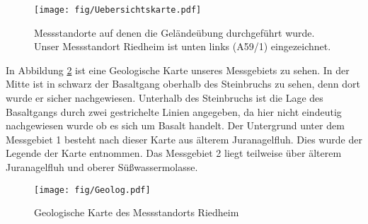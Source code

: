 \begin{figure}[h]
 \centering
 \texttt{[image: fig/Uebersichtskarte.pdf]}
 \caption[Messgebiete]{Messstandorte auf denen die Geländeübung durchgeführt wurde. Unser Messstandort Riedheim ist unten links (A59/1) eingezeichnet.}
 \label{abb:Messgebiete}
\end{figure}


In Abbildung \ref{abb:Geolog} ist eine Geologische Karte unseres Messgebiets zu sehen. In der Mitte ist in schwarz der Basaltgang oberhalb des Steinbruchs zu sehen, denn dort wurde er sicher nachgewiesen.
Unterhalb des Steinbruchs ist die Lage des Basaltgangs durch zwei gestrichelte Linien angegeben, da hier nicht eindeutig nachgewiesen wurde ob es sich um Basalt handelt. Der Untergrund unter dem Messgebiet 1 besteht nach dieser Karte aus älterem Juranagelfluh. Dies wurde der Legende der Karte entnommen. Das Messgebiet 2 liegt teilweise über älterem Juranagelfluh und oberer Süßwassermolasse.

\begin{figure}
 \centering
 \texttt{[image: fig/Geolog.pdf]}
 \caption[Geologische Karte]{Geologische Karte des Messstandorts Riedheim}
 \label{abb:Geolog}
\end{figure}



